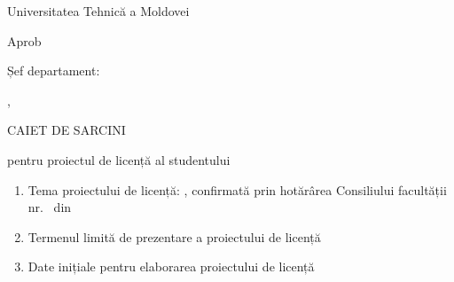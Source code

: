 


\begin{titlepage}

    {\large Universitatea Tehnică a Moldovei \par}
    \bigskip
    
    \begin{minipage}{0.75\textwidth}
        {\facultyname \par}
        {\departmentname \par}
        {\programname \par}            
    \end{minipage}

	\vfill
	
	\hfill
	\begin{minipage}{0.35\textwidth}
	    \raggedleft
    	{\small Aprob \par}
    	{\small Șef departament: \par}
    	{\small \chairmanname, \chairmantitle \par}
    	\bigskip
    	{\small \dotfill \par}
    	{\small \councildate \par}
    \end{minipage}
	
	\vfill
	
	{\large CAIET DE SARCINI \par}
	{\large pentru proiectul de licență al studentului \par}
	{\large \authorname \par}
	
	\vfill
	
    \begin{enumerate}[label=\arabic*.]
    
        \item Tema proiectului de licență: \emph{\titlero},
        confirmată prin hotărârea Consiliului facultății nr. \emph{\councilnr}\ din \emph{\councildate}
        
        \item Termenul limită de prezentare a proiectului de licență \emph{\taskend}
        
        \item Date inițiale pentru elaborarea proiectului de licență
        

\end{enumerate}
\end{titlepage}
